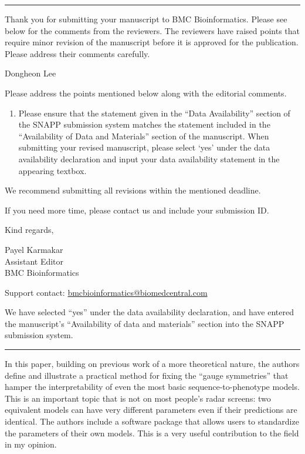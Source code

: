 \documentclass[11pt]{article}
\newenvironment{response}{\par\color{responseblue}}{\par}
\newcommand{\reviewersection}[1]{%
  \bigskip\par\noindent{\large\bfseries #1}\par\medskip\hrule\medskip}
\begin{document}
\reviewersection{Editor Comments}

Thank you for submitting your manuscript to BMC Bioinformatics. Please see below
for the comments from the reviewers. The reviewers have raised points that
require minor revision of the manuscript before it is approved for the
publication. Please address their comments carefully.

Dongheon Lee

Please address the points mentioned below along with the editorial comments.

\begin{enumerate}
\item Please ensure that the statement given in the ``Data Availability'' section
of the SNAPP submission system matches the statement included in the
``Availability of Data and Materials'' section of the manuscript. When submitting
your revised manuscript, please select `yes' under the data availability
declaration and input your data availability statement in the appearing textbox.
\end{enumerate}

We recommend submitting all revisions within the mentioned deadline.

If you need more time, please contact us and include your submission ID.

Kind regards,

Payel Karmakar\\
Assistant Editor\\
BMC Bioinformatics

Support contact: \href{mailto:bmcbioinformatics@biomedcentral.com}{bmcbioinformatics@biomedcentral.com}

\medskip

\begin{response}
We have selected ``yes'' under the data availability declaration, and
have entered the manuscript's ``Availability of data and materials''
section into the SNAPP submission system.


\end{response}

\reviewersection{Reviewer 1}

In this paper, building on previous work of a more theoretical nature, the authors
define and illustrate a practical method for fixing the ``gauge symmetries'' that
hamper the interpretability of even the most basic sequence-to-phenotype models.
This is an important topic that is not on most people's radar screens: two
equivalent models can have very different parameters even if their predictions
are identical. The authors include a software package that allows users to
standardize the parameters of their own models. This is a very useful
contribution to the field in my opinion.
\end{document}
